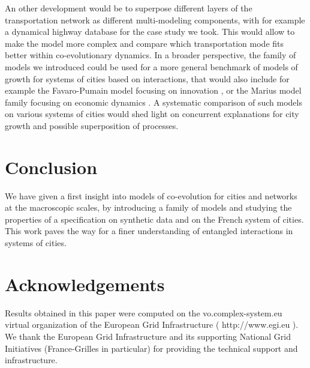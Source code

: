 An other development would be to superpose different layers of the transportation network as different multi-modeling components, with for example a dynamical highway database for the case study we took. This would allow to make the model more complex and compare which transportation mode fits better within co-evolutionary dynamics. In a broader perspective, the family of models we introduced could be used for a more general benchmark of models of growth for systems of cities based on interactions, that would also include for example the Favaro-Pumain model focusing on innovation \citep{favaro2011gibrat}, or the Marius model family focusing on economic dynamics \citep{cottineau2014evolution}. A systematic comparison of such models on various systems of cities would shed light on concurrent explanations for city growth and possible superposition of processes.


\section*{Conclusion}

We have given a first insight into models of co-evolution for cities and networks at the macroscopic scales, by introducing a family of models and studying the properties of a specification on synthetic data and on the French system of cities. This work paves the way for a finer understanding of entangled interactions in systems of cities.





\section*{Acknowledgements}

Results obtained in this paper were computed on the vo.complex-system.eu virtual organization of the European Grid Infrastructure ( http://www.egi.eu ). We thank the European Grid Infrastructure and its supporting National Grid Initiatives (France-Grilles in particular) for providing the technical support and infrastructure.

















